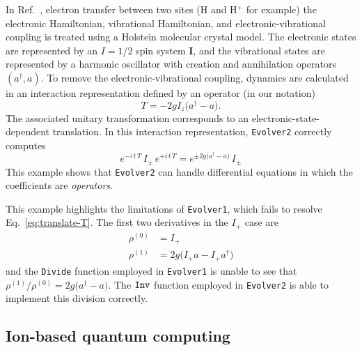 In Ref.~, electron transfer between two sites (H and H$^{+}$ for example) the electronic Hamiltonian, vibrational Hamiltonian, and electronic-vibrational coupling is treated using a Holstein molecular crystal model.
The electronic states are represented by an $I = 1/2$ spin system $\bm{I}$, and the vibrational states are represented by a harmonic oscillator with creation and annihilation operators $(a^{\dagger}, a)$.
To remove the electronic-vibrational coupling, dynamics are calculated in an interaction representation defined by an operator (in our notation)
\begin{equation}
T = -2 g I_z \big( a^{\dagger} - a \big).
\end{equation}
The associated unitary transformation corresponds to an electronic-state-dependent translation.
In this interaction representation, \verb+Evolver2+ correctly computes
\begin{equation}
e^{-i \, t \, T } \, I_{\pm} \, e^{+i \, t \, T } = e^{\pm 2 g  \big( a^{\dagger} - a \big)} \,  I_{\pm}
\label{eq:translate-T}
\end{equation}
This example shows that \verb+Evolver2+ can handle differential equations in which the coefficients are \emph{operators}.

This example highlights the limitations of \verb+Evolver1+, which fails to resolve Eq.~\ref{eq:translate-T}.
The first two derivatives in the $I_{+}$ case are
\begin{align}
\rho^{(0)} &= I_{+} \\
\rho^{(1)} &= 2 g \big( I_{+} a - I_{+} a^{\dagger} \big)
\end{align}
and the \verb+Divide+ function employed in \verb+Evolver1+ is unable to see that $\rho^{(1)}/\rho^{(0)} = 2 g  \big( a^{\dagger} - a \big)$.
The $\verb+Inv+$ function employed in \verb+Evolver2+ is able to implement this division correctly.

\subsection{Ion-based quantum computing}
\label{sec:qc}
%
%
%

